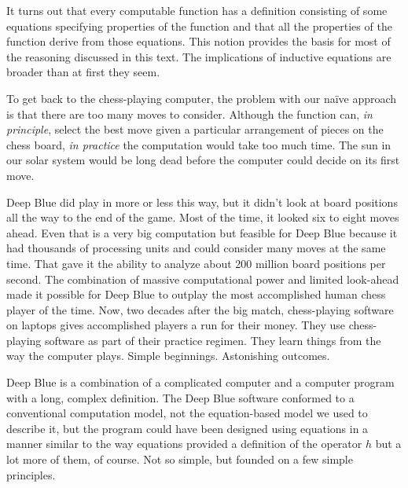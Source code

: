 It turns out that every computable function has a definition consisting
of some equations specifying properties of the function
and that all the properties of the function derive
from those equations.
This notion provides the basis for most of the reasoning
discussed in this text.
The implications of inductive equations
are broader than at first they seem.

To get back to the chess-playing computer, the problem with our
na\"ive approach is that there are too many moves to consider.
Although the function can, \emph{in principle},
select the best move given a particular arrangement of pieces on the chess board,
\emph{in practice} the computation
would take too much time.
The sun in our solar system would be long dead
before the computer could decide on its first move.

Deep Blue
did play in more or less this way, but it didn't look at board positions
all the way to the end of the game. Most of the time, it looked
six to eight moves ahead. Even that is a very big computation
but feasible for Deep Blue because it had
thousands of processing units and could consider many moves at the same time.
That gave it the ability to analyze about 200 million board positions per second.
The combination of massive computational power and limited look-ahead
made it possible for Deep Blue to outplay
the most accomplished human chess player of the time.
Now, two decades after the big match,
chess-playing software on laptops
gives accomplished players a run for their money.
They use chess-playing software as part of their
practice regimen. They learn things from the way
the computer plays. Simple beginnings.
Astonishing outcomes.

Deep Blue is a combination of a complicated computer
and a computer program with a long, complex definition.
The Deep Blue software conformed to a conventional computation model,
not the equation-based model we used to describe it,
but the program could have been designed
using equations in a manner similar to the
way equations provided a definition of the operator $h$
but a lot more of them, of course.
Not so simple, but founded on a few simple principles.

